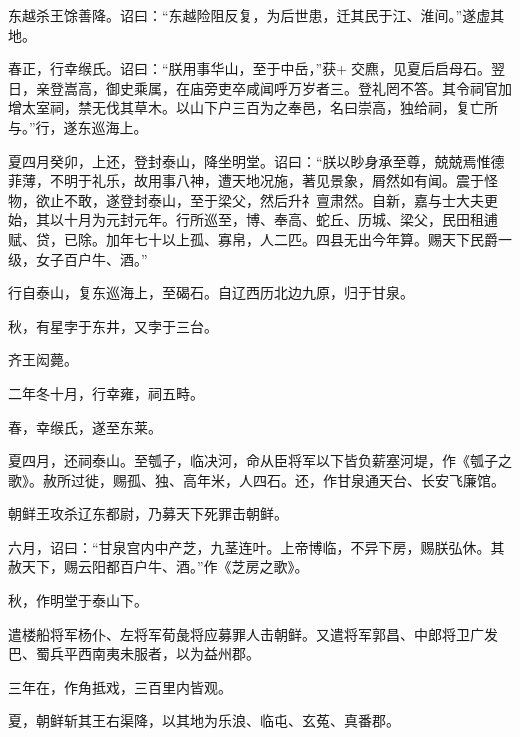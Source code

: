 \documentclass[12pt,UTF8]{ctexbook}
\begin{document}
东越杀王馀善降。诏曰：“东越险阻反复，为后世患，迁其民于江、淮间。”遂虚其地。



春正，行幸缑氏。诏曰：“朕用事华山，至于中岳，”获+交麃，见夏后启母石。翌日，亲登嵩高，御史乘属，在庙旁吏卒咸闻呼万岁者三。登礼罔不答。其令祠官加增太室祠，禁无伐其草木。以山下户三百为之奉邑，名曰崇高，独给祠，复亡所与。”行，遂东巡海上。



夏四月癸卯，上还，登封泰山，降坐明堂。诏曰：“朕以眇身承至尊，兢兢焉惟德菲薄，不明于礼乐，故用事八神，遭天地况施，著见景象，屑然如有闻。震于怪物，欲止不敢，遂登封泰山，至于梁父，然后升礻亶肃然。自新，嘉与士大夫更始，其以十月为元封元年。行所巡至，博、奉高、蛇丘、历城、梁父，民田租逋赋、贷，已除。加年七十以上孤、寡帛，人二匹。四县无出今年算。赐天下民爵一级，女子百户牛、酒。”



行自泰山，复东巡海上，至碣石。自辽西历北边九原，归于甘泉。



秋，有星孛于东井，又孛于三台。



齐王闳薨。



二年冬十月，行幸雍，祠五畤。



春，幸缑氏，遂至东莱。



夏四月，还祠泰山。至瓠子，临决河，命从臣将军以下皆负薪塞河堤，作《瓠子之歌》。赦所过徙，赐孤、独、高年米，人四石。还，作甘泉通天台、长安飞廉馆。



朝鲜王攻杀辽东都尉，乃募天下死罪击朝鲜。



六月，诏曰：“甘泉宫内中产芝，九茎连叶。上帝博临，不异下房，赐朕弘休。其赦天下，赐云阳都百户牛、酒。”作《芝房之歌》。



秋，作明堂于泰山下。



遣楼船将军杨仆、左将军荀彘将应募罪人击朝鲜。又遣将军郭昌、中郎将卫广发巴、蜀兵平西南夷未服者，以为益州郡。



三年在，作角抵戏，三百里内皆观。



夏，朝鲜斩其王右渠降，以其地为乐浪、临屯、玄菟、真番郡。
\end{document}
